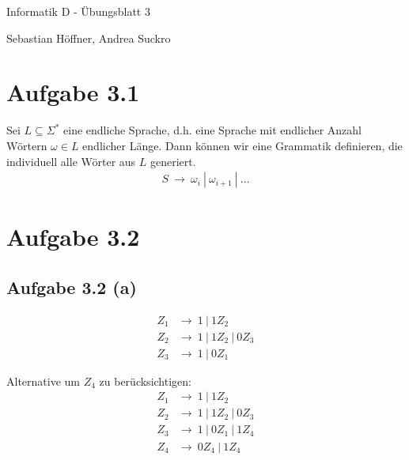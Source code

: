 \documentclass{article}
\begin{document}
\begin{center}
  \Large{Informatik D - Übungsblatt 3}

  \large{Sebastian Höffner, Andrea Suckro}
\end{center}



\section*{Aufgabe 3.1}
Sei $L \subseteq \Sigma^{*}$ eine endliche Sprache, d.h. eine Sprache mit endlicher Anzahl Wörtern $\omega \in L$ endlicher Länge. Dann können wir eine Grammatik definieren, die individuell alle Wörter aus $L$ generiert.
\begin{align*}
S\ \rightarrow\ \omega_i\ |\ \omega_{i+1}\ |\ ...
\end{align*}



\section*{Aufgabe 3.2}
\subsection{Aufgabe 3.2 (a)}
\begin{align*}
Z_1 &\rightarrow\ 1\ |\ 1Z_2 \\
Z_2 &\rightarrow\ 1\ |\ 1Z_2\ |\ 0Z_3 \\
Z_3 &\rightarrow\ 1\ |\ 0Z_1
\end{align*}

Alternative um $Z_4$ zu berücksichtigen:
\begin{align*}
Z_1 &\rightarrow\ 1\ |\ 1Z_2 \\
Z_2 &\rightarrow\ 1\ |\ 1Z_2\ |\ 0Z_3 \\
Z_3 &\rightarrow\ 1\ |\ 0Z_1\ |\ 1Z_4 \\
Z_4 &\rightarrow\ 0Z_4\ |\ 1Z_4
\end{align*}
\end{document}
